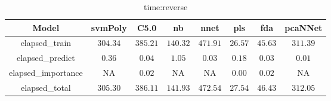 \begin{table}[!ht]
	\centering
	\begin{tabular}{|c|c|c|c|c|c|c|c|}
		\hline
		Model & svmPoly & C5.0 & nb & nnet & pls & fda & pcaNNet \\ \hline
		elapsed_train & $304.34$ & $385.21$ & $140.32$ & $471.91$ & $26.57$ & $45.63$ & $311.39$ \\ \hline
		elapsed_predict & $0.36$ & $0.04$ & $1.05$ & $0.03$ & $0.18$ & $0.03$ & $0.01$ \\ \hline
		elapsed_importance & NA & $0.02$ & NA & NA & $0.00$ & $0.02$ & NA \\ \hline
		elapsed_total & $305.30$ & $386.11$ & $141.93$ & $472.54$ & $27.54$ & $46.43$ & $312.05$ \\ \hline
	\end{tabular}
	\caption{time:reverse}
	\label{tab:time:reverse}
\end{table}
